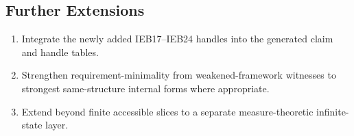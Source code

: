 \subsection{Further Extensions}

\begin{enumerate}
\item Integrate the newly added IEB17--IEB24 handles into the generated claim and handle tables.
\item Strengthen requirement-minimality from weakened-framework witnesses to strongest same-structure internal forms where appropriate.
\item Extend beyond finite accessible slices to a separate measure-theoretic infinite-state layer.
\end{enumerate}
